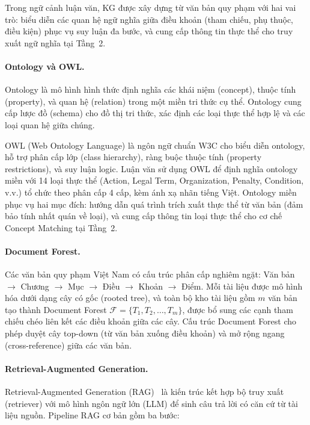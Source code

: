 Trong ngữ cảnh luận văn, KG được xây dựng từ văn bản quy phạm với hai vai trò: biểu
diễn các quan hệ ngữ nghĩa giữa điều khoản (tham chiếu, phụ thuộc, điều kiện) phục
vụ suy luận đa bước, và cung cấp thông tin thực thể cho truy xuất ngữ nghĩa tại
Tầng~2.

\paragraph{Ontology và OWL.}
\label{subsec:ontology-owl}
Ontology là mô hình hình thức định nghĩa các khái niệm (concept), thuộc tính
(property), và quan hệ (relation) trong một miền tri thức cụ thể. Ontology cung cấp
lược đồ (schema) cho đồ thị tri thức, xác định các loại thực thể hợp lệ và các
loại quan hệ giữa chúng.

OWL (Web Ontology Language) là ngôn ngữ chuẩn W3C cho biểu diễn ontology, hỗ trợ
phân cấp lớp (class hierarchy), ràng buộc thuộc tính (property restrictions), và suy
luận logic. Luận văn sử dụng OWL để định nghĩa ontology miền với 14 loại thực thể
(Action, Legal Term, Organization, Penalty, Condition, v.v.) tổ chức theo phân cấp
4 cấp, kèm ánh xạ nhãn tiếng Việt. Ontology miền phục vụ hai mục đích: hướng dẫn
quá trình trích xuất thực thể từ văn bản (đảm bảo tính nhất quán về loại), và cung
cấp thông tin loại thực thể cho cơ chế Concept Matching tại Tầng~2.

\paragraph{Document Forest.}
\label{subsec:document-forest}
Các văn bản quy phạm Việt Nam có cấu trúc phân cấp nghiêm ngặt: Văn bản $\to$
Chương $\to$ Mục $\to$ Điều $\to$ Khoản $\to$ Điểm. Mỗi tài liệu được mô hình hóa
dưới dạng cây có gốc (rooted tree), và toàn bộ kho tài liệu gồm $m$ văn bản tạo
thành Document Forest $\mathcal{F} = \{T_1, T_2, \ldots, T_m\}$, được bổ sung các
cạnh tham chiếu chéo liên kết các điều khoản giữa các cây. Cấu trúc Document Forest
cho phép duyệt cây top-down (từ văn bản xuống điều khoản) và mở rộng ngang
(cross-reference) giữa các văn bản.

\paragraph{Retrieval-Augmented Generation.}
\label{sec:cslt-rag}
Retrieval-Augmented Generation (RAG)~\cite{lewis2020rag} là kiến trúc kết hợp bộ
truy xuất (retriever) với mô hình ngôn ngữ lớn (LLM) để sinh câu trả lời có căn cứ
từ tài liệu nguồn. Pipeline RAG cơ bản gồm ba bước:


